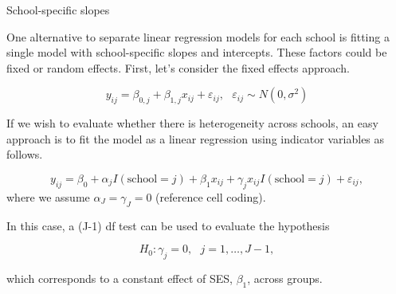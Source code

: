 \documentclass[ignorenonframetext,]{beamer}
\begin{document}
\begin{frame}{School-specific slopes}

One alternative to separate linear regression models for each school is
fitting a single model with school-specific slopes and intercepts. These
factors could be fixed or random effects. First, let's consider the
fixed effects approach.

\[y_{ij}=\beta_{0,j}+\beta_{1,j}x_{ij}+\varepsilon_{ij}, ~~~ \varepsilon_{ij} \sim N(0,\sigma^2)\]

If we wish to evaluate whether there is heterogeneity across schools, an
easy approach is to fit the model as a linear regression using indicator
variables as follows.

\end{frame}

\begin{frame}{}

\[y_{ij}=\beta_0+\alpha_jI(\text{school}=j) + \beta_1x_{ij} + \gamma_jx_{ij}I(\text{school}=j) + \varepsilon_{ij},\]
where we assume \(\alpha_J=\gamma_J=0\) (reference cell coding).

In this case, a (J-1) df test can be used to evaluate the hypothesis

\[H_0: \gamma_j=0,~~~ j=1,\ldots,J-1,\]

which corresponds to a constant effect of SES, \(\beta_1\), across
groups.

\end{frame}
\end{document}
